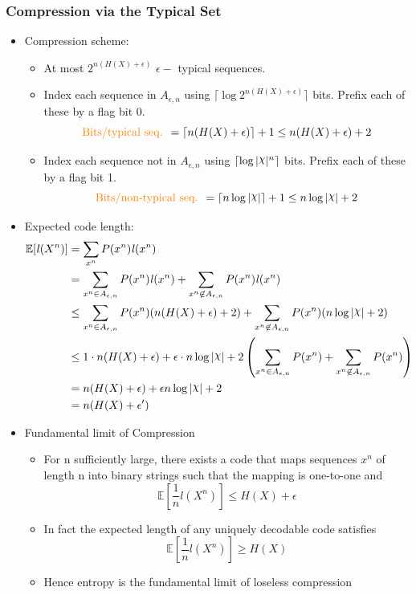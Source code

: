 \documentclass[24pt]{article}
\DeclareRobustCommand{\rchi}{{\mathpalette\irchi\relax}}
\newcommand{\irchi}[2]{\raisebox{\depth}{$#1\chi$}} %
\begin{document}
\subsubsection{Compression via the Typical Set}
\begin{itemize}
\item Compression scheme:
\begin{itemize}
\item At most $2^{n(H(X)+\epsilon)}$ $\epsilon - $ typical sequences.
\item Index each sequence in $A_{\epsilon,n}$ using $\lceil  \log 2^{n(H(X)+\epsilon)} \rceil$  bits. Prefix each of these by a flag bit 0.
$$\textrm{\textcolor{orange}{Bits/typical seq. }}=  \lceil n(H(X)+\epsilon) \rceil + 1 \le n(H(X)+\epsilon) + 2  $$
\item Index each sequence not in $A_{\epsilon,n}$ using $\lceil  \log |\rchi|^n \rceil$  bits. Prefix each of these by a flag bit 1.
$$\textrm{\textcolor{orange}{Bits/non-typical seq. }}=  \lceil n\log |\rchi| \rceil + 1 \le n\log |\rchi| + 2  $$


\end{itemize}
\item Expected code length:
\begin{align*}
\mathbb{E}[\mathit{l}(X^n)] &= \sum_{x^n}P(x^n)\mathit{l}(x^n)\\
&= \sum_{x^n \in A_{\epsilon,n}}P(x^n)\mathit{l}(x^n ) + \sum_{x^n \not \in A_{\epsilon,n}}P(x^n)\mathit{l}(x^n) \\
&\le  \sum_{x^n \in A_{\epsilon,n}}P(x^n)(n(H(X)+\epsilon) +2) + \sum_{x^n \not \in A_{\epsilon,n}}P(x^n)(n\log |\rchi| + 2)\\
&\le 1 \cdot n(H(X)+\epsilon) + \epsilon \cdot n\log |\rchi| + 2\left(\sum_{x^n \in A_{\epsilon,n}}P(x^n) +  \sum_{x^n \not \in A_{\epsilon,n}}P(x^n)  \right)\\
&= n(H(X)+\epsilon) + \epsilon  n\log |\rchi| + 2\\
&= n(H(X)+\epsilon ^\prime)
\end{align*}
\item Fundamental limit of Compression
\begin{itemize}
\item For n sufficiently large, there exists a code that maps sequences $x^n$ of length n into binary strings such that the mapping is one-to-one and 
$$\mathbb{E}[\frac{1}{n}\mathit{l}(X^n)] \le H(X) + \epsilon$$
\item In fact the expected length of any uniquely decodable code satisfies 
$$\mathbb{E}[\frac{1}{n}\mathit{l}(X^n)] \ge H(X)$$
\item Hence entropy is the fundamental limit of loseless compression
\end{itemize}


\end{itemize}
\end{document}
